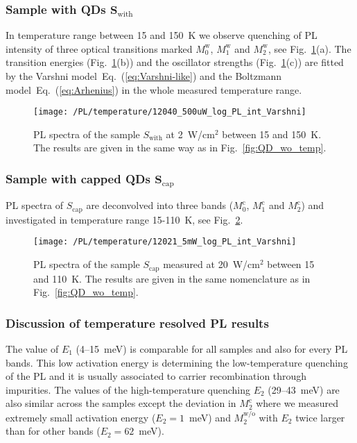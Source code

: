 \subsubsection*{Sample with QDs $\mathbf{S_\mathrm{with}}$}
%
In temperature range between 15 and 150~K we observe quenching of PL intensity of three optical transitions marked $M_0^\mathrm{w}$, $M_1^\mathrm{w}$ and $M_2^\mathrm{w}$, see Fig.~\ref{fig:QD_w_temp}(a). The transition energies (Fig.~\ref{fig:QD_w_temp}(b)) and the oscillator strengths (Fig.~\ref{fig:QD_w_temp}(c)) are fitted by the Varshni model~Eq.~(\ref{eq:Varshni-like}) and the Boltzmann model~Eq.~(\ref{eq:Arhenius}) in the whole measured temperature range.  
%
\begin{figure}
	\centering
	\texttt{[image: /PL/temperature/12040\_500uW\_log\_PL\_int\_Varshni]}
	\caption{PL spectra of the sample ${S_\mathrm{with}}$ at 2~W/cm$^2$ between 15 and 150~K. The results are given in the same way as in Fig.~\ref{fig:QD_wo_temp}.}
	\label{fig:QD_w_temp}
\end{figure}

\newpage
\subsubsection*{Sample with capped QDs $\mathbf{S_\mathrm{cap}}$}
%
PL spectra of ${S_\mathrm{cap}}$ are deconvolved into three bands ($M_0^\mathrm{c}$, $M_1^\mathrm{c}$ and $M_2^\mathrm{c}$) and investigated in temperature range 15-110~K, see Fig.~\ref{fig:QD_c_temp}.
%
\begin{figure}[h]
	\centering
	\texttt{[image: /PL/temperature/12021\_5mW\_log\_PL\_int\_Varshni]}
	\caption{PL spectra of the sample ${S_\mathrm{cap}}$ measured at 20~W/cm$^2$ between 15 and 110~K. The results are given in the same nomenclature as in Fig.~\ref{fig:QD_wo_temp}.}
	\label{fig:QD_c_temp}
\end{figure}

\newpage
\subsubsection*{Discussion of temperature resolved PL results}
The value of $E_1$ (4--15~meV) is comparable for all samples and also for every PL bands. This low activation energy is determining the low-temperature quenching of the PL and it is usually associated to carrier recombination through impurities. The values of the high-temperature quenching $E_2$ (29--43~meV) are also similar across the samples except the deviation in $M_2^\mathrm{c}$ where we measured extremely small activation energy ($E_2=1$~meV) and $M_2^\mathrm{w/o}$ with $E_2$ twice larger than for other bands ($E_2=62$~meV).

